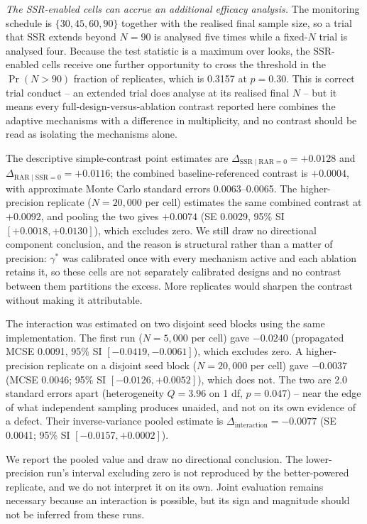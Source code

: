 \documentclass[11pt]{article}
\begin{document}
\textit{The SSR-enabled cells can accrue an additional efficacy analysis.}
The monitoring schedule is $\{30,45,60,90\}$ together with the realised final
sample size, so a trial that SSR extends beyond $N=90$ is analysed five times
while a fixed-$N$ trial is analysed four.  Because the test statistic is a
maximum over looks, the SSR-enabled cells receive one further opportunity to
cross the threshold in the $\Pr(N>90)$ fraction of replicates, which is 0.3157
at $p=0.30$.  This is correct trial conduct -- an extended trial does analyse
at its realised final $N$ -- but it means every full-design-versus-ablation
contrast reported here combines the adaptive mechanisms with a difference in
multiplicity, and no contrast should be read as isolating the mechanisms
alone.

The descriptive simple-contrast point estimates are
$\Delta_{\mathrm{SSR}\mid\mathrm{RAR}=0}=+0.0128$ and
$\Delta_{\mathrm{RAR}\mid\mathrm{SSR}=0}=+0.0116$; the combined
baseline-referenced contrast is $+0.0004$, with approximate Monte Carlo
standard errors 0.0063--0.0065.  The higher-precision replicate
($N=20{,}000$ per cell) estimates the same combined contrast at $+0.0092$, and
pooling the two gives $+0.0074$ (SE 0.0029, 95\% SI $[+0.0018,+0.0130]$), which
excludes zero.  We still draw no directional component conclusion, and the
reason is structural rather than a matter of precision: $\gamma^*$ was
calibrated once with every mechanism active and each ablation retains it, so
these cells are not separately calibrated designs and no contrast between them
partitions the excess.  More replicates would sharpen the contrast without
making it attributable.

The interaction was estimated on two disjoint seed blocks using the same
implementation.  The first run
($N=5{,}000$ per cell) gave $-0.0240$ (propagated MCSE 0.0091, 95\% SI
$[-0.0419,-0.0061]$), which excludes zero.  A higher-precision replicate on a
disjoint seed block ($N=20{,}000$ per cell) gave $-0.0037$ (MCSE 0.0046; 95\%
SI $[-0.0126,+0.0052]$), which does not.  The two are 2.0 standard errors apart
(heterogeneity $Q = 3.96$ on 1 df, $p = 0.047$) -- near the edge of what
independent sampling produces unaided, and not on its own evidence of a defect.
Their inverse-variance pooled estimate is $\Delta_\text{interaction} = -0.0077$
(SE 0.0041; 95\% SI $[-0.0157,+0.0002]$).

We report the pooled value and draw no directional conclusion.  The
lower-precision run's interval excluding zero is not reproduced by the
better-powered replicate, and we do not interpret it on its own.  Joint evaluation
remains necessary because an interaction is possible, but its sign and
magnitude should not be inferred from these runs.
\end{document}
